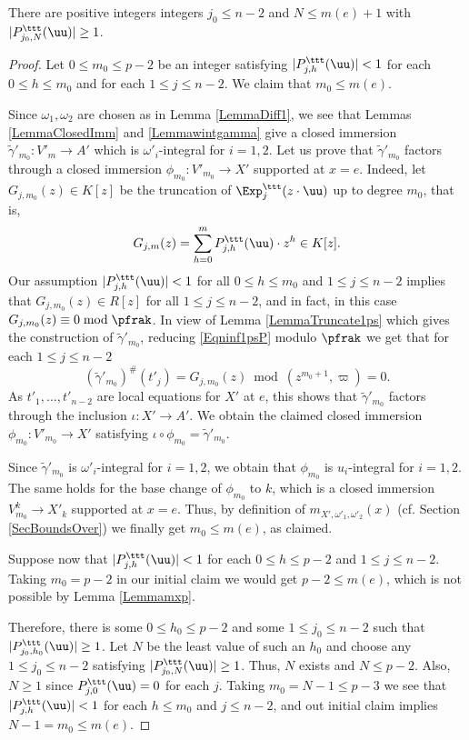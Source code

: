 \begin{lemma}
\notready\label{LemmaBdNm} There are positive integers integers  $j_0\le n-2$ and $N\le m(e)+1$ with $|P^{\ttt}_{j_0,N}(\uu)|\ge 1$.
\end{lemma}
\begin{proof} Let $0\le m_0\le p-2$ be an integer satisfying $|P^{\ttt}_{j,h}(\uu)|< 1$ for each $0\le h\le m_0$ and for each $1\le j\le n-2$. We claim that $m_0\le m(e)$.

Since $\omega_1,\omega_2$ are chosen as in Lemma \ref{LemmaDiff1}, we see that Lemmas \ref{LemmaClosedImm} and \ref{Lemmawintgamma} give a closed immersion $\tilde{\gamma}'_{m_0}: V'_m\to A'$ which is $\omega'_i$-integral for $i=1,2$. Let us prove that $\tilde{\gamma}'_{m_0}$ factors through a closed immersion $\phi_{m_0}:V'_{m_0}\to X'$ supported at $x=e$. Indeed, let $G_{j,m_0}(z)\in K[z]$ be the truncation of $\Exp^\ttt_{j}(z\cdot \uu)$ up to degree $m_0$, that is,
$$
G_{j,m}(z)=\sum_{h=0}^m  P^{\ttt}_{j,h}(\uu)\cdot z^h\in K[z].
$$
Our assumption $|P^{\ttt}_{j,h}(\uu)|< 1$ for all $0\le h\le m_0$ and $1\le j\le n-2$ implies that $G_{j,m_0}(z)\in R[z]$ for all $1\le j\le n-2$, and in fact, in this case $G_{j,m_0}(z)\equiv 0 \bmod \pfrak$. In view of Lemma \ref{LemmaTruncate1ps} which gives the construction of $\tilde{\gamma}'_{m_0}$, reducing  \eqref{Eqninf1psP} modulo $\pfrak$ we get  that for each $1\le j\le n-2$
$$
(\tilde{\gamma}'_{m_0})^\#(t'_j)= G_{j,m_0}(z) \bmod (z^{m_0+1},\varpi)=0.
$$
As $t'_1,...,t'_{n-2}$ are local equations for $X'$ at $e$, this shows that $\tilde{\gamma}'_{m_0}$ factors through the inclusion $\iota:X'\to A'$. We obtain the claimed closed immersion $\phi_{m_0}:V'_{m_0}\to X'$ satisfying $\iota\circ \phi_{m_0}=\tilde{\gamma}'_{m_0}$.

Since $\tilde{\gamma}'_{m_0}$ is $\omega'_i$-integral for $i=1,2$, we obtain that $\phi_{m_0}$ is $u_i$-integral for $i=1,2$. The same holds for the base change of $\phi_{m_0}$ to $k$, which is a closed immersion $V^k_{m_0}\to X'_k$ supported at $x=e$. Thus, by definition of $m_{X',\omega'_1,\omega'_2}(x)$ (cf. Section \ref{SecBoundsOver}) we finally get $m_0\le m(e)$, as claimed.

Suppose now that $|P^{\ttt}_{j,h}(\uu)|< 1$ for each $0\le h\le p-2$ and $1\le j\le n-2$. Taking $m_0=p-2$ in our initial claim we would get $p-2\le m(e)$, which is not possible by Lemma \ref{Lemmamxp}.

Therefore, there is some $0\le h_0\le p-2$ and some $1\le j_0\le n-2$ such that $|P^{\ttt}_{j_0,h_0}(\uu)|\ge 1$. Let $N$ be the least value of such an $h_0$ and choose any $1\le j_0\le n-2$ satisfying $|P^{\ttt}_{j_0,N}(\uu)|\ge 1$. Thus, $N$ exists and $N\le p-2$. Also, $N\ge 1$ since $P^{\ttt}_{j,0}(\uu)=0$ for each $j$. Taking $m_0=N-1\le p-3$ we see that $|P^{\ttt}_{j,h}(\uu)|< 1$ for each $h\le m_0$ and  $j\le n-2$, and out initial claim implies $N-1=m_0\le m(e)$.
\end{proof}


